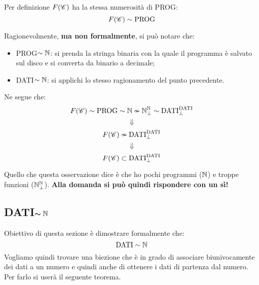 Per definizione $F(\mathscr{C})$ ha la stessa numerosità di PROG:
$$ F(\mathscr{C}) \sim \text{PROG} $$

Ragionevolmente, \textbf{ma non formalmente}, si può notare che:
\begin{itemize}
    \item PROG$\sim\mathbb{N}$: si prenda la stringa binaria con la quale il programma è
        salvato sul disco e si converta da binario a decimale;
    \item DATI$\sim\mathbb{N}$: si applichi lo stesso ragionamento del punto precedente.
\end{itemize}
Ne segue che:
$$ F(\mathscr{C}) \sim \text{PROG} \sim \mathbb{N} \nsim\mathbb{N}^{\mathbb{N}}_\perp\sim \text{DATI}^\text{DATI}_\perp$$
$$ \Downarrow $$
$$ F(\mathscr{C}) \nsim \text{DATI}^\text{DATI}_\perp $$
$$ \Downarrow $$
$$ F(\mathscr{C}) \subset \text{DATI}^\text{DATI}_\perp $$

Quello che questa osservazione dice è che ho pochi programmi ($\mathbb{N}$) e troppe
funzioni ($\mathbb{N}^{\mathbb{N}}_\perp$).
\textbf{Alla domanda  si può quindi 
rispondere con un sì!}

\subsection{\texorpdfstring{DATI$\bm{\sim\mathbb{N}}$}{DATI~N}}
Obiettivo di questa sezione è dimostrare formalmente che:
$$ \text{DATI} \sim \mathbb{N} $$
Vogliamo quindi trovare una biezione che è in grado di associare biunivocamente
dei dati a un numero e quindi anche di ottenere i dati di partenza dal
numero. Per farlo si userà il seguente teorema.

